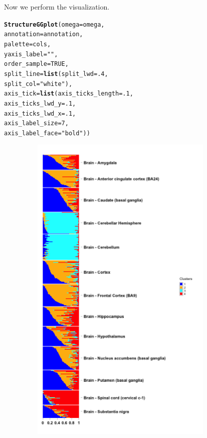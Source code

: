 \documentclass[12pt]{article}\usepackage[]{graphicx}\usepackage[usenames,dvipsnames]{color}
\makeatletter
\newcommand{\hlnum}[1]{\textcolor[rgb]{0.686,0.059,0.569}{#1}}%
\newcommand{\hlstr}[1]{\textcolor[rgb]{0.192,0.494,0.8}{#1}}%
\newcommand{\hlstd}[1]{\textcolor[rgb]{0.345,0.345,0.345}{#1}}%
\newcommand{\hlkwc}[1]{\textcolor[rgb]{0.333,0.667,0.333}{#1}}%
\newcommand{\hlkwd}[1]{\textcolor[rgb]{0.737,0.353,0.396}{\textbf{#1}}}%
\newenvironment{kframe}{%
 \def\at@end@of@kframe{}%
 \ifinner\ifhmode%
  \def\at@end@of@kframe{\end{minipage}}%
  \begin{minipage}{\columnwidth}%
 \fi\fi%
 \def\FrameCommand##1{\hskip\@totalleftmargin \hskip-\fboxsep
 \colorbox{shadecolor}{##1}\hskip-\fboxsep
     \hskip-\linewidth \hskip-\@totalleftmargin \hskip\columnwidth}%
 \MakeFramed {\advance\hsize-\width
   \@totalleftmargin\z@ \linewidth\hsize
   \@setminipage}}%
 {\par\unskip\endMakeFramed%
 \at@end@of@kframe}
\newenvironment{knitrout}{}{} %
\makeatother
\begin{document}
Now we perform the visualization.

\begin{knitrout}
\color{fgcolor}\begin{kframe}
\begin{alltt}
\hlkwd{StructureGGplot}\hlstd{(}\hlkwc{omega} \hlstd{= omega,}
                \hlkwc{annotation}\hlstd{= annotation,}
                \hlkwc{palette} \hlstd{= cols,}
                \hlkwc{yaxis_label} \hlstd{=} \hlstr{""}\hlstd{,}
                \hlkwc{order_sample} \hlstd{=} \hlnum{TRUE}\hlstd{,}
                \hlkwc{split_line} \hlstd{=} \hlkwd{list}\hlstd{(}\hlkwc{split_lwd} \hlstd{=} \hlnum{.4}\hlstd{,}
                                  \hlkwc{split_col} \hlstd{=} \hlstr{"white"}\hlstd{),}
                \hlkwc{axis_tick} \hlstd{=} \hlkwd{list}\hlstd{(}\hlkwc{axis_ticks_length} \hlstd{=} \hlnum{.1}\hlstd{,}
                                 \hlkwc{axis_ticks_lwd_y} \hlstd{=} \hlnum{.1}\hlstd{,}
                                 \hlkwc{axis_ticks_lwd_x} \hlstd{=} \hlnum{.1}\hlstd{,}
                                 \hlkwc{axis_label_size} \hlstd{=} \hlnum{7}\hlstd{,}
                                 \hlkwc{axis_label_face} \hlstd{=} \hlstr{"bold"}\hlstd{))}
\end{alltt}
\end{kframe}
\end{knitrout}


\begin{figure}[htp]
\begin{center}
\includegraphics[width=4in,height=6in]{figures/gtex_annot-1}
\end{center}
\end{figure}
\end{document}
